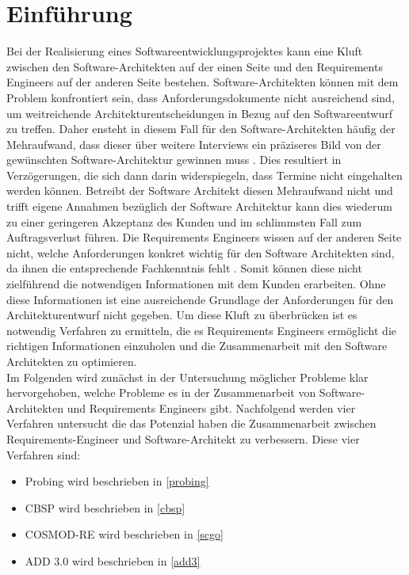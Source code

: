 \section{Einf\"uhrung}
Bei der Realisierung eines Softwareentwicklungsprojektes kann eine Kluft zwischen den Software-Architekten auf der einen Seite und den Requirements Engineers auf der anderen Seite bestehen. Software-Architekten k\"onnen mit dem Problem konfrontiert sein, dass Anforderungsdokumente nicht ausreichend sind, um weitreichende Architekturentscheidungen in Bezug auf den Softwareentwurf zu treffen. Daher ensteht in diesem Fall f\"ur den Software-Architekten h\"aufig der Mehraufwand, dass dieser \"uber weitere Interviews ein pr\"aziseres Bild von der gew\"unschten Software-Architektur gewinnen muss \cite{Ros01}. Dies resultiert in Verz\"ogerungen, die sich dann darin widerspiegeln, dass Termine nicht eingehalten werden k\"onnen. Betreibt der Software Architekt diesen Mehraufwand nicht und trifft eigene Annahmen bez\"uglich der Software Architektur \cite{Ros01} kann dies wiederum zu einer geringeren Akzeptanz des Kunden und im schlimmsten Fall zum Auftragsverlust f\"uhren. Die Requirements Engineers wissen auf der anderen Seite nicht, welche Anforderungen konkret wichtig f\"ur den Software Architekten sind, da ihnen die entsprechende Fachkenntnis fehlt \cite{Ros01}. Somit k\"onnen diese nicht zielf\"uhrend die notwendigen Informationen mit dem Kunden erarbeiten. Ohne diese Informationen ist eine ausreichende Grundlage der Anforderungen f\"ur den Architekturentwurf nicht gegeben. Um diese Kluft zu \"uberbr\"ucken ist es notwendig Verfahren zu ermitteln, die es Requirements Engineers erm\"oglicht die richtigen Informationen einzuholen und die Zusammenarbeit mit den Software Architekten zu optimieren.\\

Im Folgenden wird zun\"achst in der Untersuchung möglicher Probleme klar hervorgehoben, welche Probleme es in der Zusammenarbeit von Software-Architekten und Requirements Engineers gibt. Nachfolgend werden vier Verfahren untersucht die das Potenzial haben die Zusammenarbeit zwischen Requirements-Engineer und Software-Architekt zu verbessern. Diese vier Verfahren sind:\\

\begin{itemize}
\item Probing wird beschrieben in \ref{probing}
\item CBSP wird beschrieben in \ref{cbsp}
\item COSMOD-RE wird beschrieben in \ref{scgo}
\item ADD 3.0 wird beschrieben in \ref{add3}\\
\end{itemize}

